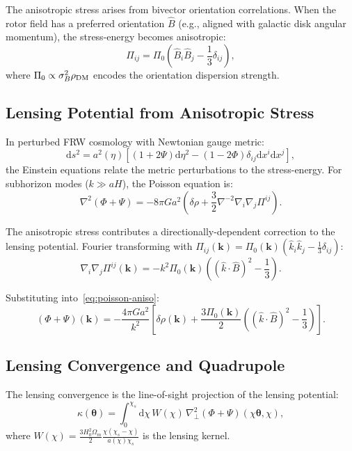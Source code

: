 \documentclass[11pt,a4paper]{article}
\numberwithin{equation}{section}
\theoremstyle{plain}
\theoremstyle{definition}
\theoremstyle{remark}
\newcommand{\dd}{\mathrm{d}}
\begin{document}
The anisotropic stress arises from bivector orientation correlations. When the rotor field has a preferred orientation $\hat B$ (e.g., aligned with galactic disk angular momentum), the stress-energy becomes anisotropic:
\begin{equation}
\Pi_{ij} = \Pi_0\left(\hat B_i \hat B_j - \frac{1}{3}\delta_{ij}\right),
\end{equation}
where $\Pi_0 \propto \sigma_B^2 \rho_{\rm DM}$ encodes the orientation dispersion strength.

\subsection{Lensing Potential from Anisotropic Stress}

In perturbed FRW cosmology with Newtonian gauge metric:
\begin{equation}
\dd s^2 = a^2(\eta)\left[(1+2\Psi)\dd\eta^2 - (1-2\Phi)\delta_{ij}\dd x^i \dd x^j\right],
\end{equation}
the Einstein equations relate the metric perturbations to the stress-energy. For subhorizon modes ($k \gg aH$), the Poisson equation is:
\begin{equation}
\nabla^2(\Phi + \Psi) = -8\pi G a^2 \left(\delta\rho + \frac{3}{2}\nabla^{-2}\nabla_i\nabla_j\Pi^{ij}\right).
\label{eq:poisson-aniso}
\end{equation}

The anisotropic stress contributes a directionally-dependent correction to the lensing potential. Fourier transforming with $\Pi_{ij}(\bm{k}) = \Pi_0(\bm{k})\left(\hat k_i \hat k_j - \frac{1}{3}\delta_{ij}\right)$:
\begin{equation}
\nabla_i\nabla_j\Pi^{ij}(\bm{k}) = -k^2 \Pi_0(\bm{k})\left((\hat k \cdot \hat B)^2 - \frac{1}{3}\right).
\end{equation}

Substituting into~\eqref{eq:poisson-aniso}:
\begin{equation}
(\Phi + \Psi)(\bm{k}) = -\frac{4\pi G a^2}{k^2}\left[\delta\rho(\bm{k}) + \frac{3\Pi_0(\bm{k})}{2}\left((\hat k \cdot \hat B)^2 - \frac{1}{3}\right)\right].
\end{equation}

\subsection{Lensing Convergence and Quadrupole}

The lensing convergence is the line-of-sight projection of the lensing potential:
\begin{equation}
\kappa(\bm{\theta}) = \int_0^{\chi_s} \dd\chi\,W(\chi)\,\nabla_\perp^2(\Phi + \Psi)(\chi\bm{\theta}, \chi),
\end{equation}
where $W(\chi) = \frac{3H_0^2\Omega_m}{2}\frac{\chi(\chi_s - \chi)}{a(\chi)\chi_s}$ is the lensing kernel.
\end{document}

